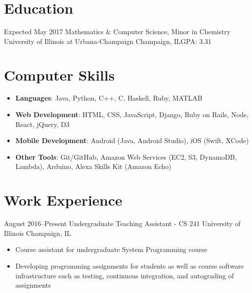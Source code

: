 \documentclass[10pt,a4paper,sans]{moderncv}        %
\begin{document}
\makecvtitle

\section{Education}

\vspace{6pt}
\cventry
{Expected May 2017}
{Mathematics \& Computer Science, Minor in Chemistry}
{University of Illinois at Urbana-Champaign}
{Champaign, IL}{}{GPA: 3.31}

\section{Computer Skills}
\vspace{5pt}
\begin{itemize}
  \vspace{3pt}
  \item
    \textbf{Languages}: Java, Python, C++, C, Haskell, Ruby, MATLAB
  \item
    \textbf{Web Development}: HTML, CSS, JavaScript, Django, Ruby on Rails, Node,
                              React, jQuery, D3
  \item
    \textbf{Mobile Development}: Android (Java, Android Studio), iOS (Swift, XCode)
  \item
    \textbf{Other Tools}: Git/GitHub, Amazon Web Services (EC2, S3, DynamoDB, Lambda),
    Arduino, Alexa Skills Kit (Amazon Echo)
\end{itemize}

\section{Work Experience}
\vspace{6pt}

\cventry
{August 2016--Present}
{\vspace{3pt}Undergraduate Teaching Assistant - CS 241}
{University of Illinois}
{Champaign, IL}{}
{
\begin{itemize}
  \item Course assistant for undergraduate System Programming course
  \item Developing programming assignments for students as well as course software
        infrastructure such as testing, continuous integration, and autograding of
        assignments
\end{itemize}}
\end{document}
